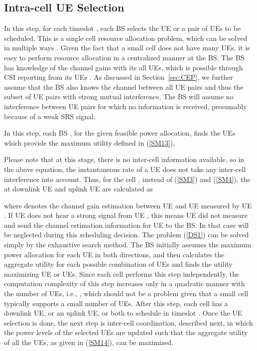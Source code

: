 \documentclass[journal]{IEEEtran}
\begin{document}
\subsection{Intra-cell UE Selection}\label{sec:DSS1}
In this step, for each timeslot , each BS selects the UE or a pair of UEs to be scheduled. This is a single cell resource allocation problem, which can be solved in multiple ways \cite{DiINFOCOM, Shaocommletter,GMSingleCell}. Given the fact that a small cell does not have many UEs, it is easy to perform resource allocation in a centralized manner at the BS. The BS has knowledge of the channel gains with its all UEs, which is possible through CSI reporting from its UEs \cite{DahlmanLTE}\cite{3GPP:5}. As discussed in Section~\ref{sec:CEP}, we further assume that the BS also knows the channel between all UE pairs and thus the subset of UE pairs with strong mutual interference. The BS will assume no interference between UE pairs for which no information is received, presumably because of a weak SRS signal. 


In this step, each BS , for the given feasible power allocation, finds the UEs which provide the maximum utility defined in (\ref{SM13}),
 

Please note that at this stage, there is no inter-cell information available, so in the above equation, the instantaneous rate of a UE does not take any inter-cell interference into account. Thus, for the cell , instead of (\ref{SM3}) and (\ref{SM4}), the  at downlink UE  and uplink UE  are calculated as 

where  denotes the channel gain estimation between UE  and UE  measured by UE . If UE  does not hear a strong signal from UE , this means UE  did not measure and send the channel estimation information for UE  to the BS. In that case  will be neglected during this scheduling decision. The problem (\ref{DS1}) can be solved simply by the exhaustive search method. The BS initially assumes the maximum power allocation for each UE in both directions, and then calculates the aggregate utility for each possible combination of UEs and finds the utility maximizing UE or UEs. Since each cell performs this step independently, the computation complexity of this step increases only in a quadratic manner with the number of UEs, i.e., , which should not be a problem given that a small cell typically supports a small number of UEs. After this step, each cell has a downlink UE, or an uplink UE, or both to schedule in timeslot . Once the UE selection is done, the next step is inter-cell coordination, described next, in which the power levels of the selected UEs are updated such that the aggregate utility of all the UEs, as given in (\ref{SM14}), can be maximized.
\end{document}
